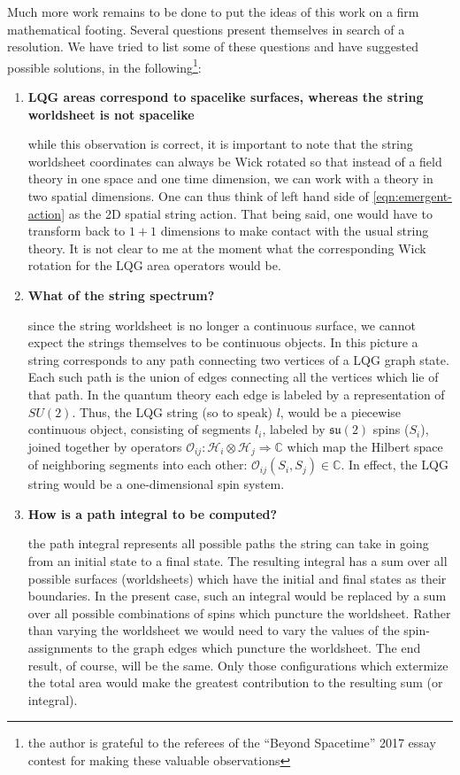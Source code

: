 \documentclass[submission, Phys]{SciPost}
\newcommand{\mc}[1]{\mathcal{#1}}
\newcommand{\mbb}[1]{\mathbb{#1}}
\newcommand{\mf}[1]{\mathfrak{#1}}
\begin{document}
Much more work remains to be done to put the ideas of this work on a firm mathematical footing. Several questions present themselves in search of a resolution. We have tried to list some of these questions and  have suggested possible solutions, in the following\footnote{the author is grateful to the referees of the ``Beyond Spacetime'' 2017 essay contest for making these valuable observations}:
\begin{enumerate}
	\item \textbf{LQG areas correspond to spacelike surfaces, whereas the string worldsheet is not spacelike}
	
	while this observation is correct, it is important to note that the string worldsheet coordinates can always be Wick rotated so that instead of a field theory in one space and one time dimension, we can work with a theory in two spatial dimensions. One can thus think of left hand side of \eqref{eqn:emergent-action} as the 2D spatial string action. That being said, one would have to transform back to $ 1+1 $ dimensions to make contact with the usual string theory. It is not clear to me at the moment what the corresponding Wick rotation for the LQG area operators would be.
	
	\item \textbf{What of the string spectrum?}
	
	since the string worldsheet is no longer a continuous surface, we cannot expect the strings themselves to be continuous objects. In this picture a string corresponds to any path connecting two vertices of a LQG graph state. Each such path is the union of edges connecting all the vertices which lie of that path. In the quantum theory each edge is labeled by a representation of $ SU(2) $. Thus, the LQG string (so to speak) $ l $, would be a piecewise continuous object, consisting of segments $ l_i$, labeled by $ \mf{su}(2) $ spins ($ S_i $), joined together by operators $ \mc{O}_{ij} : \mc{H}_i \otimes \mc{H}_j \Rightarrow \mbb{C} $ which map the Hilbert space of neighboring segments into each other: $ \mc{O}_{ij}(S_i, S_j) \in \mbb{C} $. In effect, the LQG string would be a one-dimensional spin system.
	
	\item \textbf{How is a path integral to be computed?}
	
	the path integral represents all possible paths the string can take in going from an initial state to a final state. The resulting integral has a sum over all possible surfaces (worldsheets) which have the initial and final states as their boundaries. In the present case, such an integral would be replaced by a sum over all possible combinations of spins which puncture the worldsheet. Rather than varying the worldsheet we would need to vary the values of the spin-assignments to the graph edges which puncture the worldsheet. The end result, of course, will be the same. Only those configurations which extermize the total area would make the greatest contribution to the resulting sum (or integral).
	
\end{enumerate}
\end{document}
